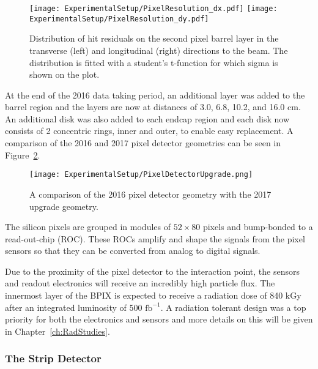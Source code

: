 \begin{figure}[h!]
\texttt{[image: ExperimentalSetup/PixelResolution\_dx.pdf]}
\texttt{[image: ExperimentalSetup/PixelResolution\_dy.pdf]}
\caption{Distribution of hit residuals on the second pixel barrel layer in the transverse (left) and longitudinal (right) directions to the beam. The distribution is fitted with a student's t-function for which sigma is shown on the plot.}
\label{fig:PixelRes}
\end{figure}

At the end of the 2016 data taking period, an additional layer was added to the barrel region and the layers are now at distances of 3.0, 6.8, 10.2, and 16.0 cm. An additional disk was also added to each endcap region and each disk now consists of 2 concentric rings, inner and outer, to enable easy replacement.  A comparison of the 2016 and 2017 pixel detector geometries can be seen in Figure~\ref{fig:PixelUpgrade}\cite{CMSTracker}. 

\begin{figure}[h!]
\texttt{[image: ExperimentalSetup/PixelDetectorUpgrade.png]}
\caption{A comparison of the 2016 pixel detector geometry with the 2017 upgrade geometry.}
\label{fig:PixelUpgrade}
\end{figure}

The silicon pixels are grouped in modules of $52 \times 80$ pixels and bump-bonded to a read-out-chip (ROC). These ROCs amplify and shape the signals from the pixel sensors so that they can be converted from analog to digital signals.  

Due to the proximity of the pixel detector to the interaction point, the sensors and readout electronics will receive an incredibly high particle flux. The 
innermost layer of the BPIX is expected to receive a radiation dose of 840 kGy after an integrated luminosity of 500 $\mathrm{fb}^{-1}$.  A radiation tolerant design was a top priority for both the electronics and sensors and more details on this will be given in Chapter~\ref{ch:RadStudies}.


\subsubsection{The Strip Detector}

